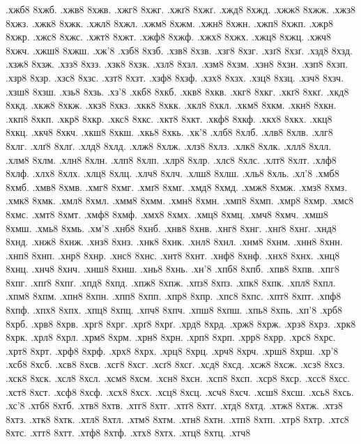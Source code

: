 {%
.хжб8
8хжб.
.хжв8
8хжв.
.хжг8
8хжг.
.хжґ8
8хжґ.
.хжд8
8хжд.
.хжж8
8хжж.
.хжз8
8хжз.
.хжк8
8хжк.
.хжл8
8хжл.
.хжм8
8хжм.
.хжн8
8хжн.
.хжп8
8хжп.
.хжр8
8хжр.
.хжс8
8хжс.
.хжт8
8хжт.
.хжф8
8хжф.
.хжх8
8хжх.
.хжц8
8хжц.
.хжч8
8хжч.
.хжш8
8хжш.
.хж'8
.хзб8
8хзб.
.хзв8
8хзв.
.хзг8
8хзг.
.хзґ8
8хзґ.
.хзд8
8хзд.
.хзж8
8хзж.
.хзз8
8хзз.
.хзк8
8хзк.
.хзл8
8хзл.
.хзм8
8хзм.
.хзн8
8хзн.
.хзп8
8хзп.
.хзр8
8хзр.
.хзс8
8хзс.
.хзт8
8хзт.
.хзф8
8хзф.
.хзх8
8хзх.
.хзц8
8хзц.
.хзч8
8хзч.
.хзш8
8хзш.
.хзь8
8хзь.
.хз'8
.хкб8
8хкб.
.хкв8
8хкв.
.хкг8
8хкг.
.хкґ8
8хкґ.
.хкд8
8хкд.
.хкж8
8хкж.
.хкз8
8хкз.
.хкк8
8хкк.
.хкл8
8хкл.
.хкм8
8хкм.
.хкн8
8хкн.
.хкп8
8хкп.
.хкр8
8хкр.
.хкс8
8хкс.
.хкт8
8хкт.
.хкф8
8хкф.
.хкх8
8хкх.
.хкц8
8хкц.
.хкч8
8хкч.
.хкш8
8хкш.
.хкь8
8хкь.
.хк'8
.хлб8
8хлб.
.хлв8
8хлв.
.хлг8
8хлг.
.хлґ8
8хлґ.
.хлд8
8хлд.
.хлж8
8хлж.
.хлз8
8хлз.
.хлк8
8хлк.
.хлл8
8хлл.
.хлм8
8хлм.
.хлн8
8хлн.
.хлп8
8хлп.
.хлр8
8хлр.
.хлс8
8хлс.
.хлт8
8хлт.
.хлф8
8хлф.
.хлх8
8хлх.
.хлц8
8хлц.
.хлч8
8хлч.
.хлш8
8хлш.
.хль8
8хль.
.хл'8
.хмб8
8хмб.
.хмв8
8хмв.
.хмг8
8хмг.
.хмґ8
8хмґ.
.хмд8
8хмд.
.хмж8
8хмж.
.хмз8
8хмз.
.хмк8
8хмк.
.хмл8
8хмл.
.хмм8
8хмм.
.хмн8
8хмн.
.хмп8
8хмп.
.хмр8
8хмр.
.хмс8
8хмс.
.хмт8
8хмт.
.хмф8
8хмф.
.хмх8
8хмх.
.хмц8
8хмц.
.хмч8
8хмч.
.хмш8
8хмш.
.хмь8
8хмь.
.хм'8
.хнб8
8хнб.
.хнв8
8хнв.
.хнг8
8хнг.
.хнґ8
8хнґ.
.хнд8
8хнд.
.хнж8
8хнж.
.хнз8
8хнз.
.хнк8
8хнк.
.хнл8
8хнл.
.хнм8
8хнм.
.хнн8
8хнн.
.хнп8
8хнп.
.хнр8
8хнр.
.хнс8
8хнс.
.хнт8
8хнт.
.хнф8
8хнф.
.хнх8
8хнх.
.хнц8
8хнц.
.хнч8
8хнч.
.хнш8
8хнш.
.хнь8
8хнь.
.хн'8
.хпб8
8хпб.
.хпв8
8хпв.
.хпг8
8хпг.
.хпґ8
8хпґ.
.хпд8
8хпд.
.хпж8
8хпж.
.хпз8
8хпз.
.хпк8
8хпк.
.хпл8
8хпл.
.хпм8
8хпм.
.хпн8
8хпн.
.хпп8
8хпп.
.хпр8
8хпр.
.хпс8
8хпс.
.хпт8
8хпт.
.хпф8
8хпф.
.хпх8
8хпх.
.хпц8
8хпц.
.хпч8
8хпч.
.хпш8
8хпш.
.хпь8
8хпь.
.хп'8
.хрб8
8хрб.
.хрв8
8хрв.
.хрг8
8хрг.
.хрґ8
8хрґ.
.хрд8
8хрд.
.хрж8
8хрж.
.хрз8
8хрз.
.хрк8
8хрк.
.хрл8
8хрл.
.хрм8
8хрм.
.хрн8
8хрн.
.хрп8
8хрп.
.хрр8
8хрр.
.хрс8
8хрс.
.хрт8
8хрт.
.хрф8
8хрф.
.хрх8
8хрх.
.хрц8
8хрц.
.хрч8
8хрч.
.хрш8
8хрш.
.хр'8
.хсб8
8хсб.
.хсв8
8хсв.
.хсг8
8хсг.
.хсґ8
8хсґ.
.хсд8
8хсд.
.хсж8
8хсж.
.хсз8
8хсз.
.хск8
8хск.
.хсл8
8хсл.
.хсм8
8хсм.
.хсн8
8хсн.
.хсп8
8хсп.
.хср8
8хср.
.хсс8
8хсс.
.хст8
8хст.
.хсф8
8хсф.
.хсх8
8хсх.
.хсц8
8хсц.
.хсч8
8хсч.
.хсш8
8хсш.
.хсь8
8хсь.
.хс'8
.хтб8
8хтб.
.хтв8
8хтв.
.хтг8
8хтг.
.хтґ8
8хтґ.
.хтд8
8хтд.
.хтж8
8хтж.
.хтз8
8хтз.
.хтк8
8хтк.
.хтл8
8хтл.
.хтм8
8хтм.
.хтн8
8хтн.
.хтп8
8хтп.
.хтр8
8хтр.
.хтс8
8хтс.
.хтт8
8хтт.
.хтф8
8хтф.
.хтх8
8хтх.
.хтц8
8хтц.
.хтч8
}
